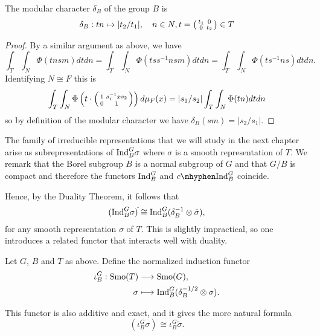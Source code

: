 \begin{prop}\label{prop:modularchar}
    The modular character $\delta_B$ of the group $B$ is
    $$\delta_B : tn \mapsto |t_2/t_1|, \quad n \in N, t = \begin{psmallmatrix}
        t_1 & 0 \\ 0 & t_2
    \end{psmallmatrix} \in T$$
\end{prop}
\begin{proof}
    By a similar argument as above, we have
    $$\int_T\int_N \Phi(tnsm) dtdn = \int_T\int_N \Phi(tss^{-1}nsm)dtdn = \int_T\int_N \Phi(ts^{-1}ns) dt dn.$$ Identifying $N \cong F$ this is
    $$\int_T\int_N \Phi\left(t \cdot \begin{psmallmatrix}
        1 & s_1^{-1}xs_2 \\0&1 
    \end{psmallmatrix}\right) d\mu_F(x) = |s_1/s_2|\int_T\int_N\Phi(tn)dtdn$$
    so by definition of the modular character we have $\delta_B(sm) = |s_2/s_1|$.
\end{proof}

The family of irreducible representations that we will study in the next chapter arise as subrepresentations of $\mathrm{Ind}_B^G\sigma$ where $\sigma$ is a smooth representation of $T$. We remark that the Borel subgroup $B$ is a normal subgroup of $G$ and that $G/B$ is compact and therefore the functors $\mathrm{Ind}_B^G$ and $\cInd_B^G$ coincide.

Hence, by the Duality Theorem, it follows that 
$$(\mathrm{Ind}_B^G\sigma)^{\check{}}\cong\mathrm{Ind}_B^G(\delta_B^{-1}\otimes\check{\sigma}),$$
for any smooth representation $\sigma$ of $T$. This is slightly impractical, so one introduces a related functor that interacts well with duality.

\begin{defn}
    Let $G$, $B$ and $T$ as above. Define the normalized induction functor 
    \begin{align*}
        \iota_B^G:\mathrm{Smo}(T)&\longrightarrow\mathrm{Smo}(G),\\
        \sigma&\longmapsto\mathrm{Ind}_B^G(\delta_B^{-1/2}\otimes\sigma).
    \end{align*}
\end{defn}
This functor is also additive and exact, and it gives the more natural formula
$$(\iota_B^G\sigma)^{\check{}}\cong\iota_B^G\check{\sigma}.$$
